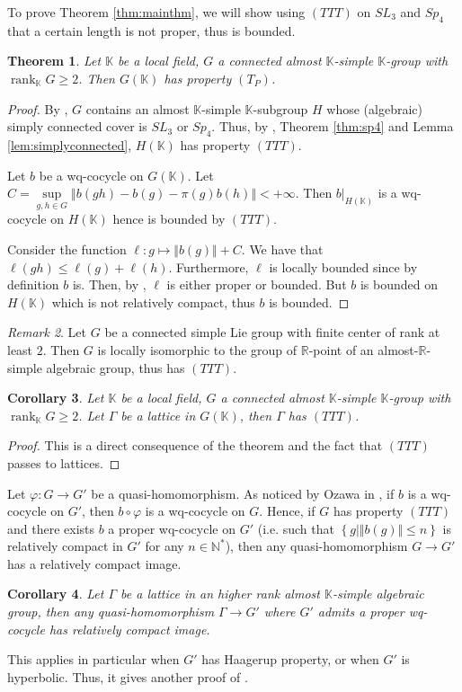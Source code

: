 \documentclass{article}
\newtheorem{theorem}{Theorem}[section]
\newtheorem{coro}[theorem]{Corollary}
\theoremstyle{definition}
\theoremstyle{remark}
\newtheorem{remark}[theorem]{Remark}
\numberwithin{equation}{section}
\newcommand{\R}{\mathbb{R}}
\newcommand{\N}{\mathbb{N}}
\newcommand{\K}{\mathbb{K}}
\DeclareMathOperator{\rank}{rank}
\begin{document}
To prove Theorem \ref{thm:mainthm}, we will show using $(TTT)$ on $SL_3$ and $Sp_4$ that a certain length is not proper, thus is bounded.

\begin{theorem}\label{thm:mainthmP}
    Let $\K$ be a local field, $G$ a connected almost $\K$-simple $\K$-group with $\rank_\K G \geq 2$. Then $G(\K)$ has property $(T_P)$.
\end{theorem}

\begin{proof}
    By \cite[Ch.I, Prop. 1.6.2]{margulis1991discrete}, $G$ contains an almost $\K$-simple $\K$-subgroup $H$ whose (algebraic) simply connected cover is $SL_3$ or $Sp_4$. Thus, by \cite[Thm.5]{Ozawa+2011+89+104}, Theorem \ref{thm:sp4} and Lemma \ref{lem:simplyconnected}, $H(\K)$ has property $(TTT)$.\medskip

 Let $b$ be a wq-cocycle on $G(\K)$. Let $C=\underset{g,h\in G}{\sup} \left\Vert b(gh)-b(g)-\pi(g)b(h)\right\Vert<+\infty$. Then $b\vert_{H(\K)}$ is a wq-cocycle on $H(\K)$ hence is bounded by $(TTT)$.\medskip

Consider the function $\ell:g\mapsto \Vert b(g)\Vert+C$. We have that $\ell(gh)\leq \ell(g)+\ell(h)$. Furthermore, $\ell$ is locally bounded since by definition $b$ is. Then, by \cite[Thm. 1.4]{cornulier}, $\ell$ is either proper or bounded. But $b$ is bounded on $H(\K)$ which is not relatively compact, thus $b$ is bounded.
\end{proof}

\begin{remark}
    Let $G$ be a connected simple Lie group with finite center of rank at least $2$. Then $G$ is locally isomorphic to the group of $\R$-point of an almost-$\R$-simple algebraic group, thus has $(TTT)$.
\end{remark}


\begin{coro}
    Let $\K$ be a local field, $G$ a connected almost $\K$-simple $\K$-group with $\rank_\K G \geq 2$. Let $\Gamma$ be a lattice in $G(\K)$, then $\Gamma$ has $(TTT)$.
\end{coro}
\begin{proof}
    This is a direct consequence of the theorem and the fact that $(TTT)$ passes to lattices.
\end{proof}

Let $\varphi:G\to G'$ be a quasi-homomorphism. As noticed by Ozawa in \cite{Ozawa+2011+89+104}, if $b$ is a wq-cocycle on $G'$, then $b\circ \varphi$ is a wq-cocycle on $G$. Hence, if $G$ has property $(TTT)$ and there exists $b$ a proper wq-cocycle on $G'$ (i.e. such that $\left\{g\vert \Vert b(g)\Vert\leq n \right\}$ is relatively compact in $G'$ for any $n\in \N^*$), then any quasi-homomorphism $G\to G'$ has a relatively compact image.
\begin{coro}
Let $\Gamma$ be a lattice in an higher rank almost $\K$-simple algebraic group, then any quasi-homomorphism $\Gamma\to G'$ where $G'$ admits a proper wq-cocycle has relatively compact image.
\end{coro}
This applies in particular when $G'$ has Haagerup property, or when $G'$ is hyperbolic. Thus, it gives another proof of \cite[Coro. 4.3]{fujiwara2016quasihomomorphisms}.
\end{document}

